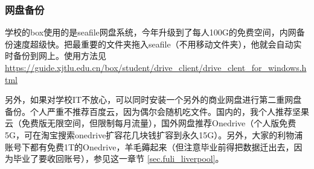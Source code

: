 \subsubsection{网盘备份}
\label{sec.net_drive_backup}

学校的box使用的是seafile网盘系统，今年升级到了每人100G的免费空间，内网备份速度超级快。把最重要的文件夹拖入seafile（不用移动文件夹），他就会自动实时备份到网上。使用方法见\url{https://guide.xjtlu.edu.cn/box/student/drive_client/drive_clent_for_windows.html}

另外，如果对学校IT不放心，可以同时安装一个另外的商业网盘进行第二重网盘备份。个人严重不推荐百度云，因为偶尔会随机吃文件。国内的，我个人推荐坚果云（免费版无限空间，但限制每月流量），国外网盘推荐Onedrive（个人版免费5G，可在淘宝搜索onedrive扩容花几块钱扩容到永久15G）。另外，大家的利物浦账号下都有免费1T的Onedrive，羊毛薅起来（但注意毕业前得把数据迁出去，因为毕业了要收回账号），参见这一章节 \ref{sec.fuli_liverpool}。


